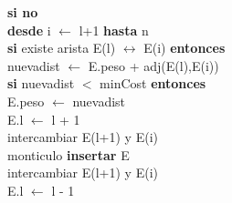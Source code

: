 \documentclass[es]{ifirak}
\begin{document}
{\hspace*{0.6cm}		\hspace*{0.8cm}	\textbf{si no} \\
\hspace*{0.6cm}		\hspace*{2.4cm}	\textbf{desde} i $\leftarrow$ l+1 \textbf{hasta} n\\ 
\hspace*{0.6cm}	\hspace*{0.6cm}	\hspace*{2.4cm}	\textbf{si} existe arista E(l) $\leftrightarrow$ E(i) \textbf{entonces}\\
\hspace*{0.6cm}	\hspace*{0.6cm}	\hspace*{3cm}	nuevadist $\leftarrow$ E.peso + adj(E(l),E(i))\\
\hspace*{0.6cm}	\hspace*{0.6cm}	\hspace*{3cm} \textbf{si} nuevadist $<$ minCost \textbf{entonces}\\
\hspace*{0.6cm}	\hspace*{0.6cm}	\hspace*{3.6cm}	 E.peso $\leftarrow$ nuevadist \\	
\hspace*{0.6cm}	\hspace*{0.6cm}	\hspace*{3.6cm}	 E.l  $\leftarrow$ l + 1 \\	
\hspace*{0.6cm}	\hspace*{0.6cm}	\hspace*{3.6cm}	intercambiar E(l+1) y E(i)\\
\hspace*{0.6cm}	\hspace*{0.6cm}	\hspace*{3.6cm}	monticulo \textbf{insertar} E\\
\hspace*{0.6cm}	\hspace*{0.6cm}	\hspace*{3.6cm}	intercambiar E(l+1) y E(i)\\
\hspace*{0.6cm}	\hspace*{0.6cm}	\hspace*{3.6cm}	 E.l  $\leftarrow$ l - 1 \\	
}
\end{document}
